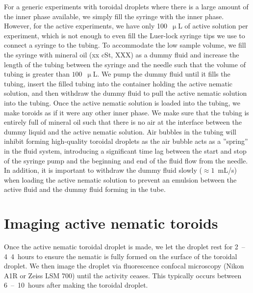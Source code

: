 For a generic experiments with toroidal droplets where there is a large amount of the inner phase available, we simply fill the syringe with the inner phase.
However, for the active experiments, we have only 100~$\upmu$L of active solution per experiment, which is not enough to even fill the Luer-lock syringe tips we use to connect a syringe to the tubing.
To accommodate the low sample volume, we fill the syringe with mineral oil (xx cSt, XXX) as a dummy fluid and increase the length of the tubing between the syringe and the needle such that the volume of tubing is greater than $100$~$\upmu$L.
We pump the dummy fluid until it fills the tubing, insert the filled tubing into the container holding the active nematic solution, and then withdraw the dummy fluid to pull the active nematic solution into the tubing.
Once the active nematic solution is loaded into the tubing, we make toroids as if it were any other inner phase.
We make sure that the tubing is entirely full of mineral oil such that there is no air at the interface between the dummy liquid and the active nematic solution.
Air bubbles in the tubing will inhibit forming high-quality toroidal droplets as the air bubble acts as a ''spring'' in the fluid system, introducing a significant time lag between the start and stop of the syringe pump and the beginning and end of the fluid flow from the needle.
In addition, it is important to withdraw the dummy fluid slowly ($\approx 1$~mL/s) when loading the active nematic solution to prevent an emulsion between the active fluid and the dummy fluid forming in the tube.




\section{Imaging active nematic toroids}
Once the active nematic toroidal droplet is made, we let the droplet rest for 2~--4~4~hours to ensure the nematic is fully formed on the surface of the toroidal droplet.
We then image the droplet via fluorescence confocal microscopy (Nikon A1R or Zeiss LSM 700) until the activity ceases.
This typically occurs between 6~--~10~hours after making the toroidal droplet.


